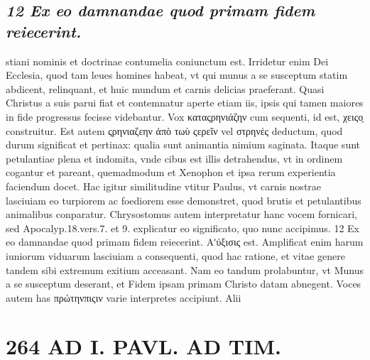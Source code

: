 \documentclass{article}
\begin{document}
\begin{pages}
\subsection*{\textit{12 Ex eo damnandae quod primam fidem reiecerint.}}stiani nominis et doctrinae contumelia coniunctum est. Irridetur enim Dei Ecclesia, quod tam leues homines habeat, vt qui munus a se susceptum statim abdicent, relinquant, et huic mundum et carnis delicias praeferant. Quasi Christus a suis parui fiat et contemnatur aperte etiam iis, ipsis qui tamen maiores in fide progressus fecisse videbantur. Vox καταςρηνιάζην cum sequenti, id est, χειςοͅ construitur. Est autem ςρηνιαζεην ἀπὸ τωὺ ςερεῖν vel στρηνὲς deductum, quod durum significat et pertinax: qualia sunt animantia nimium saginata. Itaque sunt petulantiae plena et indomita, vnde cibus est illis detrahendus, vt in ordinem cogantur et pareant, quemadmodum et Xenophon et ipsa rerum experientia faciendum docet. Hac igitur similitudine vtitur Paulus, vt carnis nostrae lasciuiam eo turpiorem ac foediorem esse demonstret, quod brutis et petulantibus animalibus conparatur. Chrysostomus autem interpretatur hanc vocem fornicari, sed Apocalyp.18.vers.7. et 9. explicatur eo significato, quo nunc accipimus. 12 Ex eo damnandae quod primam fidem reiecerint. Αʹὐξισις est. Amplificat enim harum iuniorum viduarum lasciuiam a consequenti, quod hac ratione, et vitae genere tandem sibi extremum exitium acceasant. Nam eo tandum prolabuntur, vt Munus a se susceptum deserant, et Fidem ipsam primam Christo datam abnegent. Voces autem has πρώτηνπιςιν varie interpretes accipiunt. Alii  \pend
\section*{264 AD I. PAVL. AD TIM. }\pstart {}
{}

\end{pages}
\end{document}

